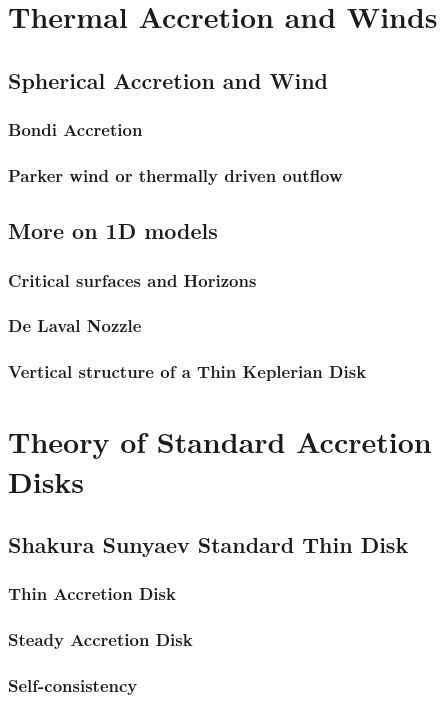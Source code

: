 \documentclass[10pt,a4paper,english]{article}
\begin{document}
\section{Thermal Accretion and Winds}
\subsection{Spherical Accretion and Wind}
\subsubsection{Bondi Accretion}
\subsubsection{Parker wind or thermally driven outflow}
\subsection{More on 1D models}
\subsubsection{Critical surfaces and Horizons}
\subsubsection{De Laval Nozzle}
\subsubsection{Vertical structure of a Thin Keplerian Disk}

\section{Theory of Standard Accretion Disks}
\subsection{Shakura Sunyaev Standard Thin Disk}
\subsubsection{Thin Accretion Disk}
\subsubsection{Steady Accretion Disk}
\subsubsection{Self-consistency}
\end{document}

